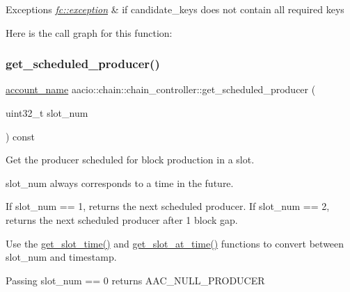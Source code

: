 \begin{DoxyExceptions}{Exceptions}
{\em \mbox{\hyperlink{classfc_1_1exception}{fc\+::exception}}} & if candidate\+\_\+keys does not contain all required keys \\
\hline
\end{DoxyExceptions}
Here is the call graph for this function\+:
\mbox{\label{classaacio_1_1chain_1_1chain__controller_a70ddb9268b9ce5cac20104ab400fb462}} 
\subsubsection{\texorpdfstring{get\+\_\+scheduled\+\_\+producer()}{get\_scheduled\_producer()}}
{\footnotesize\ttfamily \mbox{\hyperlink{structaacio_1_1chain_1_1name}{account\+\_\+name}} aacio\+::chain\+::chain\+\_\+controller\+::get\+\_\+scheduled\+\_\+producer (\begin{DoxyParamCaption}\item[{uint32\+\_\+t}]{slot\+\_\+num }\end{DoxyParamCaption}) const}



Get the producer scheduled for block production in a slot. 

slot\+\_\+num always corresponds to a time in the future.

If slot\+\_\+num == 1, returns the next scheduled producer. If slot\+\_\+num == 2, returns the next scheduled producer after 1 block gap.

Use the \mbox{\hyperlink{classaacio_1_1chain_1_1chain__controller_a16c358c4d8477b5c7f4cedbde3faa235}{get\+\_\+slot\+\_\+time()}} and \mbox{\hyperlink{classaacio_1_1chain_1_1chain__controller_a9e231a27f0c30eedeff295bbf53b318a}{get\+\_\+slot\+\_\+at\+\_\+time()}} functions to convert between slot\+\_\+num and timestamp.

Passing slot\+\_\+num == 0 returns A\+A\+C\+\_\+\+N\+U\+L\+L\+\_\+\+P\+R\+O\+D\+U\+C\+ER \mbox{\label{classaacio_1_1chain_1_1chain__controller_a9e231a27f0c30eedeff295bbf53b318a}} 
